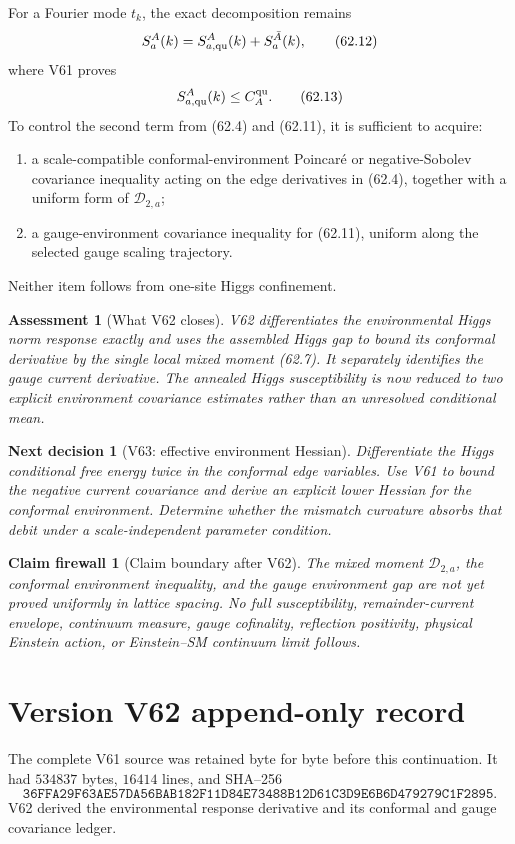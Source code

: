 \documentclass[11pt]{article}
\newtheorem{firewall}[theorem]{Claim firewall}
\newtheorem{decision}[theorem]{Next decision}
\newtheorem{assessment}[theorem]{Assessment}
\theoremstyle{remark}
\begin{document}
For a Fourier mode \(t_k\), the exact decomposition remains
\[
 S_a^A(k)
 =
 S_{a,\rm qu}^A(k)+S_a^{\bar A}(k),               \tag{62.12}
\]
where V61 proves
\[
 S_{a,\rm qu}^A(k)\leq C_A^{\rm qu}.              \tag{62.13}
\]
To control the second term from (62.4) and (62.11), it is sufficient
to acquire:
\begin{enumerate}
\item a scale-compatible conformal-environment Poincar\'e or
      negative-Sobolev covariance inequality acting on the edge
      derivatives in (62.4), together with a uniform form of
      \(\mathcal D_{2,a}\);
\item a gauge-environment covariance inequality for (62.11), uniform
      along the selected gauge scaling trajectory.
\end{enumerate}
Neither item follows from one-site Higgs confinement.

\begin{assessment}[What V62 closes]
\label{ass:v17v62-status}
V62 differentiates the environmental Higgs norm response exactly and
uses the assembled Higgs gap to bound its conformal derivative by the
single local mixed moment (62.7).  It separately identifies the gauge
current derivative.  The annealed Higgs susceptibility is now reduced
to two explicit environment covariance estimates rather than an
unresolved conditional mean.
\end{assessment}

\begin{decision}[V63: effective environment Hessian]
\label{dec:v17v62-next}
Differentiate the Higgs conditional free energy twice in the
conformal edge variables.  Use V61 to bound the negative current
covariance and derive an explicit lower Hessian for the conformal
environment.  Determine whether the mismatch curvature absorbs that
debit under a scale-independent parameter condition.
\end{decision}

\begin{firewall}[Claim boundary after V62]
\label{fire:v17v62}
The mixed moment \(\mathcal D_{2,a}\), the conformal environment
inequality, and the gauge environment gap are not yet proved uniformly
in lattice spacing.  No full susceptibility, remainder-current
envelope, continuum measure, gauge cofinality, reflection positivity,
physical Einstein action, or Einstein--SM continuum limit follows.
\end{firewall}

\section*{Version V62 append-only record}
The complete V61 source was retained byte for byte before this
continuation.  It had \(534837\) bytes, \(16414\) lines, and SHA--256
\[
 \texttt{36FFA29F63AE57DA56BAB182F11D84E73488B12D61C3D9E6B6D479279C1F2895}.
\]
V62 derived the environmental response derivative and its conformal
and gauge covariance ledger.
\end{document}

